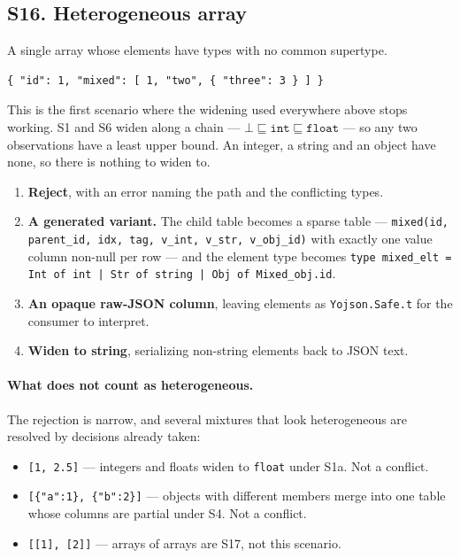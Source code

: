 \subsection*{S16. Heterogeneous array}

A single array whose elements have types with no common supertype.

\begin{lstlisting}[style=json]
{ "id": 1, "mixed": [ 1, "two", { "three": 3 } ] }
\end{lstlisting}

This is the first scenario where the widening used everywhere above stops
working. S1 and S6 widen along a chain --- $\bot \sqsubseteq \texttt{int}
\sqsubseteq \texttt{float}$ --- so any two observations have a least upper
bound. An integer, a string and an object have none, so there is nothing to
widen to.

\options
\begin{enumerate}[label=\textbf{(\alph*)}]
  \item \textbf{Reject}, with an error naming the path and the conflicting
        types. \selected
  \item \textbf{A generated variant.} The child table becomes a sparse table
        --- \texttt{mixed(id, parent\_id, idx, tag, v\_int, v\_str,
        v\_obj\_id)} with exactly one value column non-null per row --- and
        the element type becomes
        \texttt{type mixed\_elt = Int of int | Str of string | Obj of
        Mixed\_obj.id}.
  \item \textbf{An opaque raw-JSON column}, leaving elements as
        \texttt{Yojson.Safe.t} for the consumer to interpret.
  \item \textbf{Widen to string}, serializing non-string elements back to JSON
        text.
\end{enumerate}


\paragraph{What does not count as heterogeneous.}
The rejection is narrow, and several mixtures that look heterogeneous are
resolved by decisions already taken:

\begin{itemize}
  \item \texttt{[1, 2.5]} --- integers and floats widen to \texttt{float}
        under S1a. Not a conflict.
  \item \texttt{[\{"a":1\}, \{"b":2\}]} --- objects with different members
        merge into one table whose columns are partial under S4. Not a
        conflict.
  \item \texttt{[[1], [2]]} --- arrays of arrays are S17, not this scenario.
\end{itemize}

